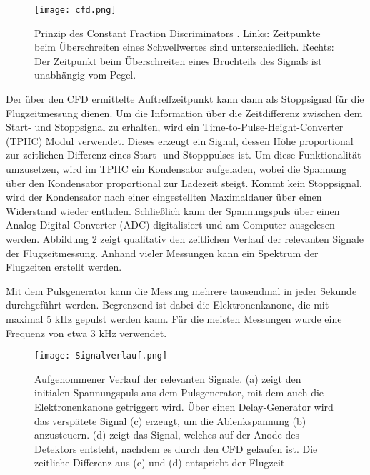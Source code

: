 \begin{figure}
    \centering
    \texttt{[image: cfd.png]}
    \caption[Prinzip des Constant Fraction Discriminators]{Prinzip des Constant Fraction Discriminators \cite{CFD_pic}. Links: Zeitpunkte beim Überschreiten eines Schwellwertes sind unterschiedlich. Rechts: Der Zeitpunkt beim Überschreiten eines Bruchteils des Signals ist unabhängig vom Pegel.\\}
    \label{fig:CFD} 
\end{figure}

Der über den CFD ermittelte Auftreffzeitpunkt kann dann als Stoppsignal für die Flugzeitmessung dienen. Um die Information über die Zeitdifferenz zwischen dem Start- und Stoppsignal zu erhalten, wird ein Time-to-Pulse-Height-Converter (TPHC) Modul verwendet. Dieses erzeugt ein Signal, dessen Höhe proportional zur zeitlichen Differenz eines Start- und Stopppulses ist. Um diese Funktionalität umzusetzen, wird im TPHC ein Kondensator aufgeladen, wobei die Spannung über den Kondensator proportional zur Ladezeit steigt. Kommt kein Stoppsignal, wird der Kondensator nach einer eingestellten Maximaldauer über einen Widerstand wieder entladen. Schließlich kann der Spannungspuls über einen Analog-Digital-Converter (ADC) digitalisiert und am Computer ausgelesen werden. Abbildung \ref{fig:Signal} zeigt qualitativ den zeitlichen Verlauf der relevanten Signale der Flugzeitmessung. Anhand vieler Messungen kann ein Spektrum der Flugzeiten erstellt werden.

Mit dem Pulsgenerator kann die Messung mehrere tausendmal in jeder Sekunde durchgeführt werden. Begrenzend ist dabei die Elektronenkanone, die mit maximal 5 kHz gepulst werden kann. Für die meisten Messungen wurde eine Frequenz von etwa 3 kHz verwendet.

\begin{figure}
    \centering
    \texttt{[image: Signalverlauf.png]}
    \caption[Aufgenommener Verlauf der relevanten Signale der ToF-Messung]{Aufgenommener Verlauf der relevanten Signale. (a) zeigt den initialen Spannungspuls aus dem Pulsgenerator, mit dem auch die Elektronenkanone getriggert wird. Über einen Delay-Generator wird das verspätete Signal (c) erzeugt, um die Ablenkspannung (b) anzusteuern. (d) zeigt das Signal, welches auf der Anode des Detektors entsteht, nachdem es durch den CFD gelaufen ist. Die zeitliche Differenz aus (c) und (d) entspricht der Flugzeit}
    \label{fig:Signal} 
\end{figure}

